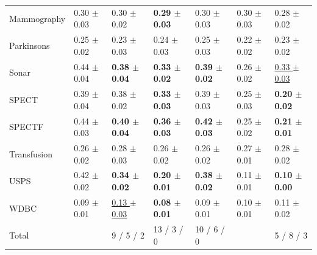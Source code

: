 \documentclass[twoside]{memoir}\usepackage[]{graphicx}\usepackage{xcolor}
\begin{document}
\begin{table}[t]
\begin{tabular}{lllll|ll}
  Mammography & 0.30 $\pm$ 0.03 & 0.30 $\pm$ 0.02 & \textbf{0.29 $\pm$ 0.03} & 0.30 $\pm$ 0.03 & 0.30 $\pm$ 0.03 & 0.28 $\pm$ 0.02 \\ 
  Parkinsons & 0.25 $\pm$ 0.02 & 0.23 $\pm$ 0.03 & 0.24 $\pm$ 0.03 & 0.25 $\pm$ 0.03 & 0.22 $\pm$ 0.02 & 0.23 $\pm$ 0.02 \\ 
  Sonar & 0.44 $\pm$ 0.04 & \textbf{0.38 $\pm$ 0.04} & \textbf{0.33 $\pm$ 0.02} & \textbf{0.39 $\pm$ 0.02} & 0.26 $\pm$ 0.02 & \underline{0.33 $\pm$ 0.03} \\ 
  SPECT & 0.39 $\pm$ 0.04 & 0.38 $\pm$ 0.02 & \textbf{0.33 $\pm$ 0.03} & 0.39 $\pm$ 0.03 & 0.25 $\pm$ 0.03 & \textbf{0.20 $\pm$ 0.02} \\ 
  SPECTF & 0.44 $\pm$ 0.03 & \textbf{0.40 $\pm$ 0.04} & \textbf{0.36 $\pm$ 0.03} & \textbf{0.42 $\pm$ 0.03} & 0.25 $\pm$ 0.02 & \textbf{0.21 $\pm$ 0.01} \\ 
  Transfusion & 0.26 $\pm$ 0.02 & 0.28 $\pm$ 0.03 & 0.26 $\pm$ 0.02 & 0.26 $\pm$ 0.02 & 0.27 $\pm$ 0.01 & 0.28 $\pm$ 0.02 \\ 
  USPS & 0.42 $\pm$ 0.02 & \textbf{0.34 $\pm$ 0.02} & \textbf{0.20 $\pm$ 0.01} & \textbf{0.38 $\pm$ 0.02} & 0.11 $\pm$ 0.01 & \textbf{0.10 $\pm$ 0.00} \\ 
  WDBC & 0.09 $\pm$ 0.01 & \underline{0.13 $\pm$ 0.03} & \textbf{0.08 $\pm$ 0.01} & 0.09 $\pm$ 0.01 & 0.10 $\pm$ 0.01 & 0.11 $\pm$ 0.02 \\ 
   \midrule
Total &  & 9 / 5 / 2 & 13 / 3 / 0 & 10 / 6 / 0 &  & 5 / 8 / 3 \\ 
   \bottomrule

\end{tabular}
\end{table}
\end{document}
